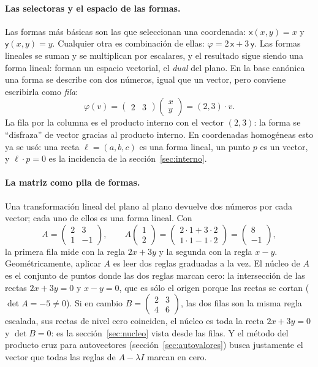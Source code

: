 \paragraph{Las selectoras y el espacio de las formas.} Las formas más básicas son las que
seleccionan una coordenada: \(\mathsf{x}(x,y)=x\) y \(\mathsf{y}(x,y)=y\). Cualquier otra
es combinación de ellas: \(\varphi=2\,\mathsf{x}+3\,\mathsf{y}\). Las formas lineales se
suman y se multiplican por escalares, y el resultado sigue siendo una forma lineal: forman
un espacio vectorial, el \emph{dual} del plano. En la base canónica una forma se describe
con dos números, igual que un vector, pero conviene escribirla como \emph{fila}:
\[
  \varphi(v)=\begin{pmatrix}2&3\end{pmatrix}\begin{pmatrix}x\\y\end{pmatrix}
  =(2,3)\cdot v .
\]
La fila por la columna es el producto interno con el vector \((2,3)\): la forma se
``disfraza'' de vector gracias al producto interno. En coordenadas homogéneas esto ya se
usó: una recta \(\ell=(a,b,c)\) es una forma lineal, un punto \(p\) es un vector, y
\(\ell\cdot p=0\) es la incidencia de la sección~\ref{sec:interno}.

\paragraph{La matriz como pila de formas.} Una transformación lineal del plano al plano
devuelve dos números por cada vector; cada uno de ellos es una forma lineal. Con
\[
  A=\begin{pmatrix}2&3\\1&-1\end{pmatrix},\qquad
  A\begin{pmatrix}1\\2\end{pmatrix}=\begin{pmatrix}2\cdot1+3\cdot2\\1\cdot1-1\cdot2\end{pmatrix}
  =\begin{pmatrix}8\\-1\end{pmatrix},
\]
la primera fila mide con la regla \(2x+3y\) y la segunda con la regla \(x-y\).
Geométricamente, aplicar \(A\) es leer dos reglas graduadas a la vez. El núcleo de \(A\)
es el conjunto de puntos donde las dos reglas marcan cero: la intersección de las rectas
\(2x+3y=0\) y \(x-y=0\), que es sólo el origen porque las rectas se cortan
(\(\det A=-5\neq0\)). Si en cambio \(B=\begin{pmatrix}2&3\\4&6\end{pmatrix}\), las dos
filas son la misma regla escalada, sus rectas de nivel cero coinciden, el núcleo es toda
la recta \(2x+3y=0\) y \(\det B=0\): es la sección~\ref{sec:nucleo} vista desde las
filas. Y el método del producto cruz para autovectores (sección~\ref{sec:autovalores})
busca justamente el vector que todas las reglas de \(A-\lambda I\) marcan en cero.


